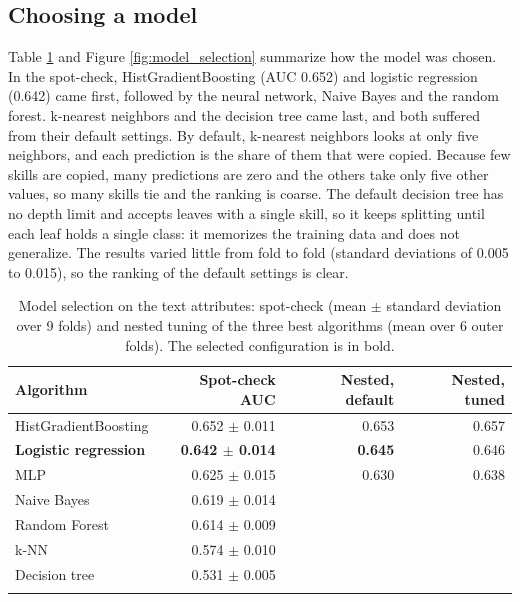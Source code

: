 \subsection{Choosing a model}\label{choosing-a-model}

Table \ref{tab:model_choose} and Figure \ref{fig:model_selection}
summarize how the model was chosen. In the spot-check,
HistGradientBoosting (AUC 0.652) and logistic regression (0.642) came
first, followed by the neural network, Naive Bayes and the random
forest. k-nearest neighbors and the decision tree came last, and both
suffered from their default settings. By default, k-nearest neighbors
looks at only five neighbors, and each prediction is the share of them
that were copied. Because few skills are copied, many predictions are
zero and the others take only five other values, so many skills tie and
the ranking is coarse. The default decision tree has no depth limit and
accepts leaves with a single skill, so it keeps splitting until each
leaf holds a single class: it memorizes the training data and does not
generalize. The results varied little from fold to fold (standard
deviations of 0.005 to 0.015), so the ranking of the default settings is
clear.

\begin{table}[!tbp]
\centering
\caption{Model selection on the text attributes: spot-check (mean \ensuremath{\pm}
standard deviation over 9 folds) and nested tuning of the three best
algorithms (mean over 6 outer folds). The selected configuration is in
bold. \label{tab:model_choose}}
\begin{tabular}{@{}lrrr@{}}
\toprule\noalign{}
Algorithm & Spot-check AUC & Nested, default & Nested, tuned \\
\midrule\noalign{}
HistGradientBoosting & 0.652 \ensuremath{\pm} 0.011 & 0.653 & 0.657 \\
\textbf{Logistic regression} & \textbf{0.642 \ensuremath{\pm} 0.014} & \textbf{0.645} &
0.646 \\
MLP & 0.625 \ensuremath{\pm} 0.015 & 0.630 & 0.638 \\
Naive Bayes & 0.619 \ensuremath{\pm} 0.014 & & \\
Random Forest & 0.614 \ensuremath{\pm} 0.009 & & \\
k-NN & 0.574 \ensuremath{\pm} 0.010 & & \\
Decision tree & 0.531 \ensuremath{\pm} 0.005 & & \\
\bottomrule\noalign{}
\end{tabular}
\end{table}

